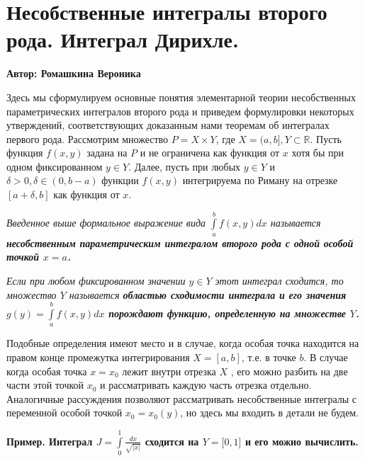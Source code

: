 \setcounter{object}{0}
\setcounter{approval}{0}
\setcounter{theorem}{0}
\setcounter{example}{0}

\chapter{Несобственные интегралы второго рода. Интеграл Дирихле.}
\centerline{ \bf Автор: Ромашкина Вероника} \vskip 1cm

Здесь мы сформулируем основные понятия элементарной теории несобственных параметрических интегралов второго рода и приведем формулировки некоторых утверждений, соответствующих доказанным нами теоремам об интегралах первого рода.
\smallskip
Рассмотрим множество $P = X \times Y$, где $ X=(a,b], Y\subset\mathbb R.$ Пусть функция $f(x,y)$ задана на $P$ и не ограничена как функция от $x$ хотя бы при одном фиксированном $y \in Y.$ Далее, пусть при любых $y \in Y$ и $\delta>0, \delta \in (0,b-a) $ функции $f(x,y)$ интегрируема по Риману  на отрезке $ [a+\delta,b]$ как функция от $x$.
\medskip

\begin{object}\itshape Введенное выше формальное выражение вида $ \int\limits_a^b f(x,y)dx$ называется \upshape \bfseries несобственным параметрическим интегралом второго рода \mdseries \itshape с одной особой точкой\upshape {} $x=a$.
\end{object}
\medskip

\begin{object}\itshape Если при любом фиксированном значении $y \in Y$ этот интеграл сходится, то множество $Y$ называется \upshape \bfseries областью сходимости интеграла \mdseries \itshape и его значения $g(y)= \int\limits_a^b f(x,y)dx$ порождают функцию, определенную на множестве $Y$.\upshape\end{object}
\medskip

Подобные определения имеют место и в случае, когда особая точка находится на правом конце промежутка интегрирования $X=[a,b]$, т.е. в точке $b$. В случае когда особая точка $x=x_0$ лежит внутри отрезка $X$ , его можно разбить на две части этой точкой $x_0$ и рассматривать каждую часть отрезка отдельно.\\
Аналогичные рассуждения позволяют рассматривать несобственные интегралы с переменной особой точкой $x_0=x_0(y)$, но здесь мы входить в детали не будем.
\medskip

\bfseries Пример. \mdseries Интеграл $ J=\int\limits_0^1 \frac{dx}{\sqrt{|x|}}$ сходится на $Y=\lbrack0,1\rbrack$ и его можно вычислить.


